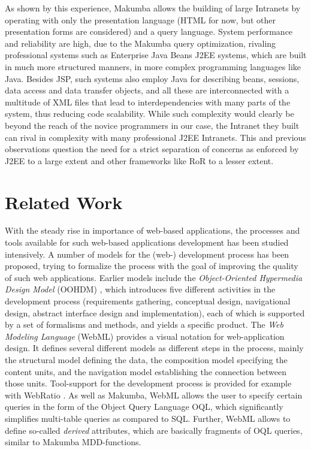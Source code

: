 \documentclass{chi2009}
\begin{document}
As shown by this experience, Makumba allows the building of large Intranets by operating with only the presentation language (HTML for now, but other presentation forms are considered) and a query language. System performance and reliability are high, due to the Makumba query optimization, rivaling professional systems such as Enterprise Java Beans J2EE systems,  which are built in much more structured manners, in more complex programming languages like Java.  Besides JSP, such systems also employ Java for describing beans, sessions, data access and data transfer objects, and all these are interconnected with a multitude of XML files that lead to interdependencies with many parts of the system, thus reducing code scalability. While such complexity would clearly be beyond the reach of the novice programmers in our case, the Intranet they built can rival in complexity with many professional J2EE Intranets. This and previous observations question the need for a strict separation of concerns as enforced by J2EE to a large extent and other frameworks like RoR to a lesser extent.


\section{Related Work}\label{sec:related}
With the steady rise in importance of web-based applications, the processes and tools available for such web-based applications development has been studied intensively. A number of models for the (web-) development process has been proposed, trying to formalize the process with the goal of improving the quality of such web applications. Earlier models include the \textit{Object-Oriented Hypermedia Design Model} (OOHDM) \cite{schwabe1998ooa}, which introduces five different activities in the development process (requirements gathering, conceptual design, navigational design, abstract interface design and implementation), each of which is supported by a set of formalisms and methods, and yields a specific product. The \textit{Web Modeling Language} (WebML) \cite{Ceri00webmodeling} provides a visual notation for web-application design. It defines several different models as different steps in the process, mainly the structural model defining the data, the composition model specifying the content units, and the navigation model establishing the connection between those units. Tool-support for the development process is provided for example with WebRatio \cite{acerbis2004wit}. 
As well as Makumba, WebML allows the user to specify certain queries in the form of the Object Query Language OQL, which significantly simplifies multi-table queries as compared to SQL. Further, WebML allows to define so-called \textit{derived} attributes, which are basically fragments of OQL queries, similar to Makumba MDD-functions.
\end{document}
